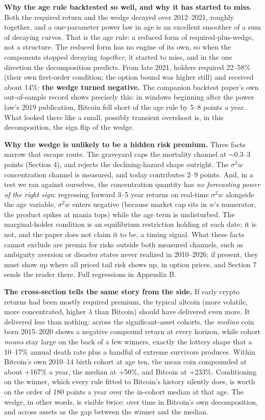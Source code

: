 \documentclass[11pt]{article}
\begin{document}
\textbf{Why the age rule backtested so well, and why it has started to miss.} Both the required return and the wedge decayed over 2012--2021, roughly together, and a one-parameter power law in age is an excellent smoother of a sum of decaying curves. That is the age rule: a reduced form of required-plus-wedge, not a structure. The reduced form has no engine of its own, so when the components stopped decaying \emph{together}, it started to miss, and in the one direction the decomposition predicts. From late 2021, holders required 22--58\% (their own first-order condition; the option bound was higher still) and received about 14\%: \textbf{the wedge turned negative.} The companion backtest paper's own out-of-sample record shows precisely this: in windows beginning after the power law's 2019 publication, Bitcoin fell short of the age rule by 5--8 points a year. What looked there like a small, possibly transient overshoot is, in this decomposition, the sign flip of the wedge.

\textbf{Why the wedge is unlikely to be a hidden risk premium.} Three facts narrow that escape route. The graveyard caps the mortality channel at $\sim$0.3--3 points (Section 4), and rejects the declining-hazard shape outright. The $\sigma^2 w$ concentration channel is measured, and today contributes 2--9 points. And, in a test we ran against ourselves, the concentration quantity has \emph{no forecasting power of the right sign}: regressing forward 3--5 year returns on real-time $\sigma^2 w$ alongside the age variable, $\sigma^2 w$ enters negative (because market cap sits in $w$'s numerator, the product spikes at mania tops) while the age term is undisturbed. The marginal-holder condition is an equilibrium restriction holding at each date; it is not, and the paper does not claim it to be, a timing signal. What these facts cannot exclude are premia for risks outside both measured channels, such as ambiguity aversion or disaster states never realized in 2010--2026; if present, they must show up where all priced tail risk shows up, in option prices, and Section 7 sends the reader there. Full regressions in Appendix B.

\textbf{The cross-section tells the same story from the side.} If early crypto returns had been mostly required premium, the typical altcoin (more volatile, more concentrated, higher $\lambda$ than Bitcoin) should have delivered even more. It delivered less than nothing: across the significant-asset cohorts, the \emph{median} coin born 2015--2020 shows a negative compound return at every horizon, while cohort \emph{means} stay large on the back of a few winners, exactly the lottery shape that a 10--17\% annual death rate plus a handful of extreme survivors produces. Within Bitcoin's own 2010--14 birth cohort at age ten, the mean coin compounded at about +167\% a year, the median at +50\%, and Bitcoin at +233\%. Conditioning on the winner, which every rule fitted to Bitcoin's history silently does, is worth on the order of 180 points a year over the in-cohort median at that age. The wedge, in other words, is visible twice: over time in Bitcoin's own decomposition, and across assets as the gap between the winner and the median.
\end{document}
